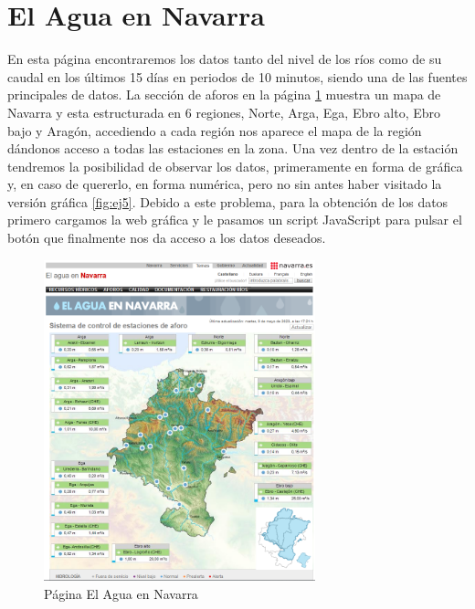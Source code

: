 \section{El Agua en Navarra}
En esta página encontraremos los datos tanto del nivel de los ríos como de su caudal en los últimos 15 días en periodos de 10 minutos, siendo una de las fuentes principales de datos.
\newline
\newline
La sección de aforos en la página \ref{fig:ej4} muestra un mapa de Navarra y esta estructurada en 6 regiones, Norte, Arga, Ega, Ebro alto, Ebro bajo y Aragón, accediendo a cada región nos aparece el mapa de la región dándonos acceso a todas las estaciones en la zona.
\newline
\newline
Una vez dentro de la estación tendremos la posibilidad de observar los datos, primeramente en forma de gráfica y, en caso de quererlo, en forma numérica, pero no sin antes haber visitado la versión gráfica \ref{fig:ej5}.
\newline
\newline
Debido a este problema, para la obtención de los datos primero cargamos la web gráfica y le pasamos un script JavaScript para pulsar el botón que finalmente nos da acceso a los datos deseados.

\begin{figure} [h!]
	\centering
	\includegraphics[width=0.7\textwidth]{fig/AguaEnNavarra.png}
	\caption[Página principal de aforos de El Agua en Navarra]{Página El Agua en Navarra}
	\label{fig:ej4}
\end{figure}

